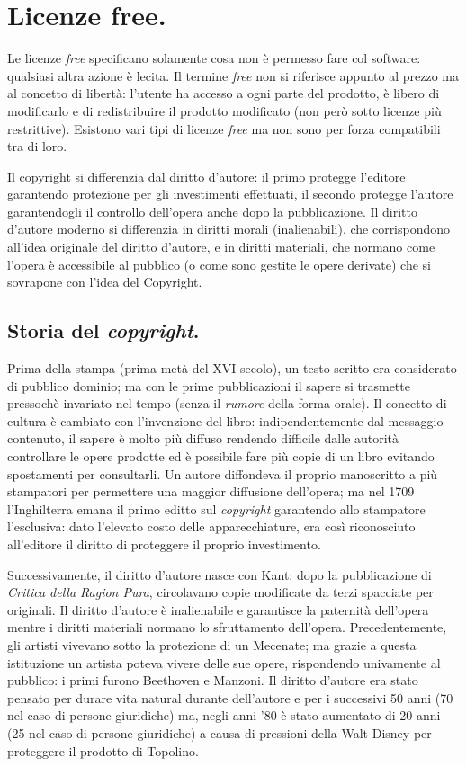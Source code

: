\documentclass[a4page, 11pt, twocolumn]{article}
\begin{document}
\section{Licenze free.}
Le licenze \textit{free} specificano solamente cosa non è permesso fare col software: qualsiasi altra azione è lecita.
Il termine \textit{free} non si riferisce appunto al prezzo ma al concetto di libertà: l'utente ha accesso a ogni parte del prodotto, è libero di modificarlo e di redistribuire il prodotto modificato (non però sotto licenze più restrittive).
Esistono vari tipi di licenze \textit{free} ma non sono per forza compatibili tra di loro.

Il copyright si differenzia dal diritto d'autore: il primo protegge l'editore garantendo protezione per gli investimenti effettuati, il secondo protegge l'autore garantendogli il controllo dell'opera anche dopo la pubblicazione.
Il diritto d'autore moderno si differenzia in diritti morali (inalienabili), che corrispondono all'idea originale del  diritto d'autore, e in diritti materiali, che normano come l'opera è accessibile al pubblico (o come sono gestite le opere derivate) che si sovrapone con l'idea del Copyright.

\subsection{Storia del \textit{copyright}.}
Prima della stampa (prima metà del XVI secolo), un testo scritto era considerato di pubblico dominio; ma con le prime pubblicazioni il sapere si trasmette pressochè invariato nel tempo (senza il \textit{rumore} della forma orale).
Il concetto di cultura è cambiato con l'invenzione del libro: indipendentemente dal messaggio contenuto, il sapere è molto più diffuso rendendo difficile dalle autorità controllare le opere prodotte ed è possibile fare più copie di un libro evitando spostamenti per consultarli.
Un autore diffondeva il proprio manoscritto a più stampatori per permettere una maggior diffusione dell'opera; ma nel 1709 l'Inghilterra emana il primo editto sul \textit{copyright} garantendo allo stampatore l'esclusiva: dato l'elevato costo delle apparecchiature, era così riconosciuto all'editore il diritto di proteggere il proprio investimento.

Successivamente, il diritto d'autore nasce con Kant: dopo la pubblicazione di \textit{Critica della Ragion Pura}, circolavano copie modificate da terzi spacciate per originali.
Il diritto d'autore è inalienabile e garantisce la paternità dell'opera mentre i diritti materiali normano lo sfruttamento dell'opera. \newline
Precedentemente, gli artisti vivevano sotto la protezione di un Mecenate; ma grazie a questa istituzione un artista poteva vivere delle sue opere, rispondendo univamente al pubblico: i primi furono Beethoven e Manzoni.
Il diritto d'autore era stato pensato per durare vita natural durante dell'autore e per i successivi 50 anni (70 nel caso di persone giuridiche) ma, negli anni '80 è stato aumentato di 20 anni (25 nel caso di persone giuridiche) a causa di pressioni della Walt Disney per proteggere il prodotto di Topolino.
\end{document}
